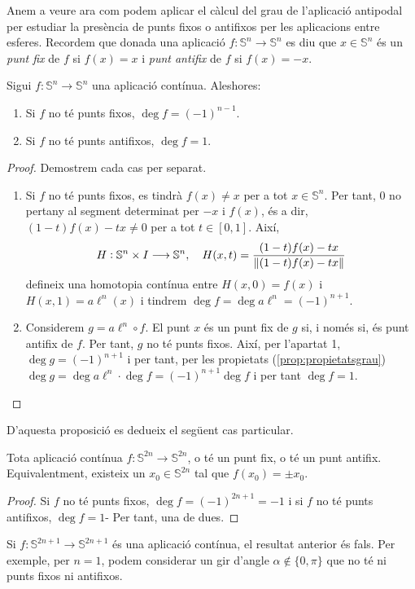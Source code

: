 \documentclass[../main.tex]{subfiles}
\begin{document}
Anem a veure ara com podem aplicar el càlcul del grau de l'aplicació antipodal per estudiar la presència de punts fixos o antifixos per les aplicacions entre esferes. Recordem que donada una aplicació $f:\mathbb{S}^n\rightarrow\mathbb{S}^n$ es diu que $x\in\mathbb{S}^n$ és un \textit{punt fix} de $f$ si $f(x) = x$ i \textit{punt antifix} de $f$ si $f(x) = -x$.

\begin{prop}
\label{prop:puntfixantifix} Sigui $f:\mathbb{S}^n\rightarrow\mathbb{S}^n$ una aplicació contínua. Aleshores:
\begin{enumerate}[(1)]
    \item Si $f$ no té punts fixos, $\deg f = (-1)^{n-1}$.
    \item Si $f$ no té punts antifixos, $\deg f = 1$.
\end{enumerate}
\end{prop}
\begin{proof}
Demostrem cada cas per separat.
\begin{enumerate}[(1)]
    \item Si $f$ no té punts fixos, es tindrà $f(x) \not =x$ per a tot $x\in\mathbb{S}^n$. Per tant, $0$ no pertany al segment determinat per $-x$ i $f(x)$, és a dir, $(1-t)f(x)-tx\not=0$ per a tot $t\in[0,1]$. Així,
    \begin{equation}
        \notag
        H:\mathbb{S}^n\times I\longrightarrow \mathbb{S}^n,\quad H(x,t) = \frac{(1-t)f(x)-tx}{\|(1-t)f(x)-tx\|}
    \end{equation}
    defineix una homotopia contínua entre $H(x,0) = f(x)$ i $H(x,1) = a\ell^n(x)$ i tindrem $\deg f = \deg a\ell^n = (-1)^{n+1}$.
    
    \item Considerem $g = a\ell^n\circ f$. El punt $x$ és un punt fix de $g$ si, i només si, és punt antifix de $f$. Per tant, $g$ no té punts fixos. Així, per l'apartat 1, $\deg g = (-1)^{n+1}$ i per tant, per les propietats (\ref{prop:propietatsgrau}) $\deg g = \deg a\ell^n\cdotp\deg f = (-1)^{n+1}\deg f$ i per tant $\deg f = 1$.
\end{enumerate}
\end{proof}

D'aquesta proposició es dedueix el següent cas particular.

\begin{coro}
Tota aplicació contínua $f:\mathbb{S}^{2n}\rightarrow\mathbb{S}^{2n}$, o té un punt fix, o té un punt antifix. Equivalentment, existeix un $x_0\in\mathbb{S}^{2n}$ tal que $f(x_0) = \pm x_0$.
\end{coro}
\begin{proof}
Si $f$ no té punts fixos, $\deg f = (-1)^{2n+1} = -1$ i si $f$ no té punts antifixos, $\deg f = 1$- Per tant, una de dues.
\end{proof}

\begin{nota}
Si $f:\mathbb{S}^{2n+1}\rightarrow\mathbb{S}^{2n+1}$ és una aplicació contínua, el resultat anterior és fals. Per exemple, per $n= 1$, podem considerar un gir d'angle $\alpha\not\in\{0,\pi\}$ que no té ni punts fixos ni antifixos.
\end{nota}
\end{document}
